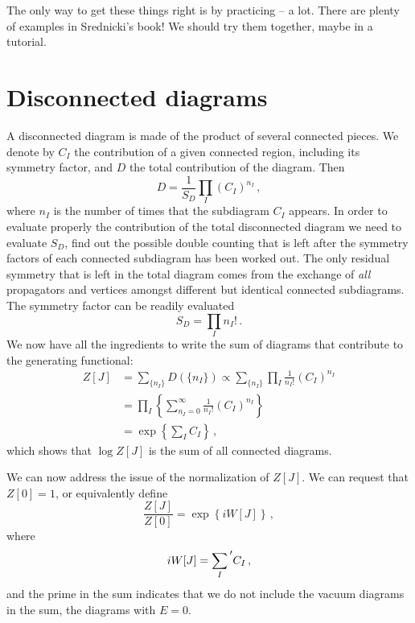The only way to get these things right is by practicing -- a lot. There are
plenty of examples in Srednicki's book! We should try them together,
maybe in a tutorial. 

\section{Disconnected diagrams}
\label{sec:disc-diagr}

A disconnected diagram is made of the product of several connected
pieces. We denote by $C_I$ the contribution of a given connected
region, including its symmetry factor, and $D$ the total contribution
of the diagram. Then
\begin{equation}
  \label{eq:TotDiscDiag}
  D = \frac{1}{S_D} \prod_I \left(C_I\right)^{n_I}\, ,
\end{equation}
where $n_I$ is the number of times that the subdiagram $C_I$ appears.
In order to evaluate properly the contribution of the total
disconnected diagram we need to evaluate $S_D$, \ie find out the
possible double counting that is left after the symmetry factors of
each connected subdiagram has been worked out. The only residual
symmetry that is left in the total diagram comes from the exchange of
{\em all} propagators and vertices amongst different but identical
connected subdiagrams. The symmetry factor can be readily evaluated
\begin{equation}
  \label{eq:OverallSymFact}
  S_D = \prod_I n_I!\, .
\end{equation}
We now have all the ingredients to write the sum of diagrams that
contribute to the generating functional:
\begin{align}
  \label{eq:GenFuncSum}
  Z[J] &= \sum_{\{n_I\}} D(\{n_I\}) 
  \propto \sum_{\{n_I\}} \prod_I \frac{1}{n_I!} \left(C_I\right)^{n_I}
  \\
       &= \prod_I \left\{ \sum_{n_I=0}^\infty \frac{1}{n_I!}
         \left(C_I\right)^{n_I}\right\} \\
       &= \exp\left\{\sum_I C_I\right\}\, ,
\end{align}
which shows that $\log Z[J]$ is the sum of all connected diagrams.

We can now address the issue of the normalization of $Z[J]$. We can
request that $Z[0]=1$, or equivalently define
\begin{equation}
  \label{eq:NormGenFunc}
  \frac{Z[J]}{Z[0]} = \exp\left\{ 
    i W[J]
    \right\}\, ,
\end{equation}
where 
\begin{equation}
  \label{eq:ConnectGenerator}
  i W[J] = \sum_I{\vphantom{\sum}}' C_I\, , 
\end{equation}
and the prime in the sum indicates that we do not include the vacuum
diagrams in the sum, \ie the diagrams with $E=0$.
